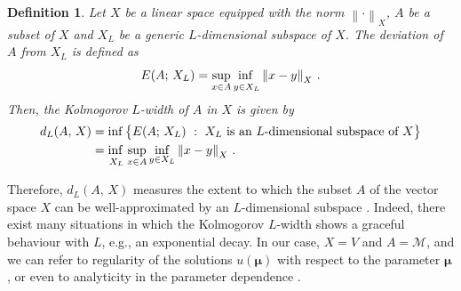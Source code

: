 \documentclass[12pt, a4paper, twoside, openright]{report}
\numberwithin{equation}{chapter}
\theoremstyle{theorem}
\theoremstyle{definition}
\newtheorem{definition}{Definition}[chapter]
\theoremstyle{remark}
\theoremstyle{proposition}
\numberwithin{figure}{chapter}
\newcommand{\norm}[1]{\left\lVert#1\right\rVert}
\newcommand{\bg}[1]{\boldsymbol{#1}}
\begin{document}
		\begin{definition}
			\emph{
			Let $X$ be a linear space equipped with the norm $\norm{\cdot}_X$, $A$ be a subset of $X$ and $X_L$ be a generic $L$-dimensional subspace of $X$. The deviation of $A$ from $X_L$ is defined as
			\begin{equation}
				E(A; \, X_L) = \adjustlimits \sup_{x \in A} \inf_{y \in X_L}  \norm{x - y}_X \, .
			\end{equation}
			Then, the \emph{Kolmogorov $L$-width} of $A$ in $X$ is given by
			\begin{equation}
				\label{eq:kolmogorov-L-width}
				\begin{aligned}
					d_L(A, \, X) & = \inf \big\lbrace E(A; \, X_L) ~ : ~ \text{$X_L$ is an $L$-dimensional subspace of $X$} \big\rbrace \\
					& = \adjustlimits \inf_{X_L} \sup_{x \in A} \inf_{y \in X_L} \norm{x - y}_X \, .
				\end{aligned}
			\end{equation}
			}
		\end{definition}
		
		Therefore, $d_L(A, \, X)$ measures the extent to which the subset $A$ of the vector space $X$ can be well-approximated by an $L$-dimensional subspace \cite{Mad06}. Indeed, there exist many situations in which the Kolmogorov $L$-width shows a graceful behaviour with $L$, e.g., an exponential decay. In our case, $X = V$ and $A = \mathcal{M}$, and we can refer to regularity of the solutions $u(\bg{\mu})$ with respect to the parameter $\bg{\mu}$, or even to analyticity in the parameter dependence \cite{Buf12}.
		
\end{document}
